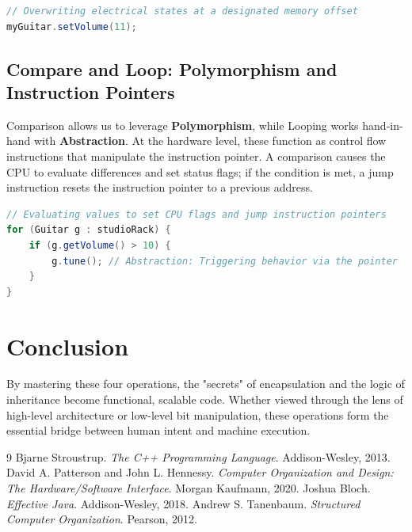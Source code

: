 \documentclass[12pt]{article}
\begin{document}
\begin{lstlisting}[language=Java, caption=Encapsulated Assignment and Bitwise Gating]
// Overwriting electrical states at a designated memory offset
myGuitar.setVolume(11); 
\end{lstlisting}

\subsection{Compare and Loop: Polymorphism and Instruction Pointers}
Comparison allows us to leverage \textbf{Polymorphism}, while Looping works hand-in-hand with \textbf{Abstraction}. At the hardware level, these function as control flow instructions that manipulate the instruction pointer. A comparison causes the CPU to evaluate differences and set status flags; if the condition is met, a jump instruction resets the instruction pointer to a previous address.

\begin{lstlisting}[language=Java, caption=Control Flow and Logic Gates]
// Evaluating values to set CPU flags and jump instruction pointers
for (Guitar g : studioRack) {
    if (g.getVolume() > 10) {
        g.tune(); // Abstraction: Triggering behavior via the pointer
    }
}
\end{lstlisting}

\section{Conclusion}
By mastering these four operations, the "secrets" of encapsulation and the logic of inheritance become functional, scalable code. Whether viewed through the lens of high-level architecture or low-level bit manipulation, these operations form the essential bridge between human intent and machine execution.

\begin{thebibliography}{9}
Bjarne Stroustrup. \textit{The C++ Programming Language}. Addison-Wesley, 2013.
David A. Patterson and John L. Hennessy. \textit{Computer Organization and Design: The Hardware/Software Interface}. Morgan Kaufmann, 2020.
Joshua Bloch. \textit{Effective Java}. Addison-Wesley, 2018.
Andrew S. Tanenbaum. \textit{Structured Computer Organization}. Pearson, 2012.
\end{thebibliography}
\end{document}
